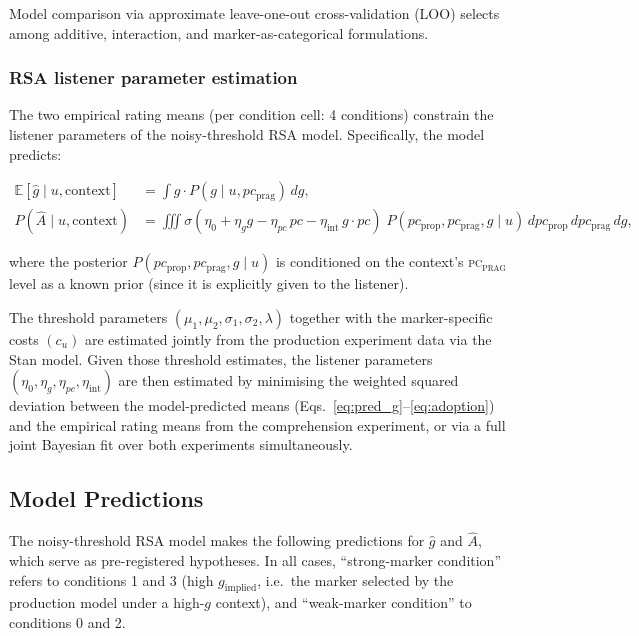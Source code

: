 \documentclass[12pt]{article}
\begin{document}
Model comparison via approximate leave-one-out cross-validation (LOO)
selects among additive, interaction, and marker-as-categorical
formulations.

\subsubsection{RSA listener parameter estimation}
\label{subsub:rsa_fit}

The two empirical rating means (per condition cell: 4 conditions) constrain
the listener parameters of the noisy-threshold RSA model.
Specifically, the model predicts:

\begin{align}
\mathbb{E}[\widehat{g} \mid u, \text{context}]
  &= \int g \cdot P(g \mid u, pc_{\mathrm{prag}})\, dg,
\label{eq:pred_g} \\
P(\widehat{A} \mid u, \text{context})
  &= \iiint \sigma(\eta_0 + \eta_g g - \eta_{pc}\, pc
     - \eta_{\mathrm{int}}\, g \cdot pc)\;
     P(pc_{\mathrm{prop}}, pc_{\mathrm{prag}}, g \mid u)\,
     d{pc_{\mathrm{prop}}}\,d{pc_{\mathrm{prag}}}\,dg,
\label{eq:adoption}
\end{align}

\noindent where the posterior $P(pc_{\mathrm{prop}}, pc_{\mathrm{prag}}, g
\mid u)$ is conditioned on the context's \textsc{pc\textsubscript{prag}}
level as a known prior (since it is explicitly given to the listener).

The threshold parameters $(\mu_1,\mu_2, \sigma_1,\sigma_2,
\lambda)$ together with the marker-specific costs $(c_u)$ are estimated
jointly from the production experiment data via the Stan model.
Given those threshold estimates, the listener parameters
$(\eta_0, \eta_g, \eta_{pc}, \eta_{\mathrm{int}})$ are then estimated by
minimising the weighted squared deviation between the model-predicted
means (Eqs.~\ref{eq:pred_g}--\ref{eq:adoption}) and the empirical rating
means from the comprehension experiment, or via a full joint Bayesian
fit over both experiments simultaneously.

\subsection{Model Predictions}

The noisy-threshold RSA model makes the following predictions for
$\widehat{g}$ and $\widehat{A}$, which serve as pre-registered hypotheses.
In all cases, ``strong-marker condition'' refers to conditions 1 and 3
(high $g_{\mathrm{implied}}$, i.e.\ the marker selected by the production
model under a high-$g$ context), and ``weak-marker condition'' to conditions
0 and 2.
\end{document}
